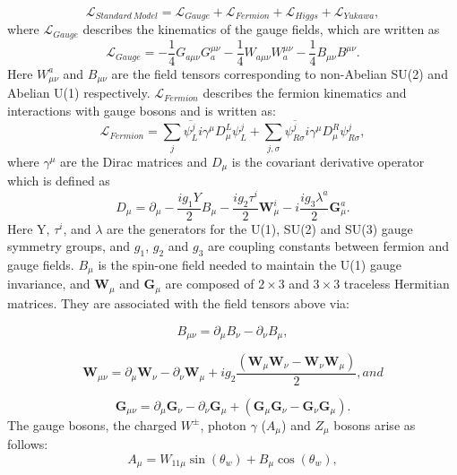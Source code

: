 \begin{equation}
    \mathcal{L}_{Standard\ Model}= \mathcal{L}_{Gauge}+ \mathcal{L}_{Fermion}+ \mathcal{L}_{Higgs}+ \mathcal{L}_{Yukawa},
  \label{eq:Standard Modelall}
\end{equation}
where $\mathcal{L}_{Gauge}$ describes the kinematics of the gauge fields, which are written as
\begin{equation}
    \mathcal{L}_{Gauge}= -\frac{1}{4}G_{a\mu\nu}G^{\mu\nu}_a - \frac{1}{4}W_{a\mu\nu}W^{\mu\nu}_a - \frac{1}{4}B_{\mu\nu}B^{\mu\nu}.
\end{equation}
Here $W_{\mu\nu}^a$ and $B_{\mu\nu}$ are the field tensors corresponding to non-Abelian SU(2) and Abelian U(1) respectively.
$\mathcal{L}_{Fermion}$ describes the fermion kinematics and interactions with gauge bosons and is written as:
\begin{equation}
    \mathcal{L}_{Fermion}=\sum_j \overline{\psi^j_L}i\gamma^\mu D^L_\mu \psi^j_L + \sum_{j, \sigma} \overline{\psi^j_{R\sigma}}i\gamma^{\mu}D^R_{\mu}\psi^j_{R\sigma},
    \label{eq:smf}
\end{equation}
where $\gamma^{\mu}$ are the Dirac matrices and $D_{\mu}$ is the covariant derivative operator which is defined as 
\begin{equation}
    D_\mu=\partial_\mu-\frac{ig_1Y}{2}B_\mu-\frac{ig_2\tau^i}{2}\mathbf{W}^i_\mu-i\frac{ig_3\lambda^a}{2}\mathbf{G}^a_\mu.
    \label{eq:dirac}
\end{equation}
Here Y, $\tau^i$, and $\lambda$ are the generators for the U(1), SU(2) and SU(3) gauge symmetry groups, and $g_1$, $g_2$ and $g_3$ 
are coupling constants between fermion and gauge fields. 
$B_\mu$ is the spin-one field needed to maintain the U(1) gauge invariance,
and $\mathbf{W}_\mu$ and $\mathbf{G}_\mu$ are composed of $2\times3$ and $3\times3$ traceless Hermitian matrices.
They are associated with the field tensors above via:

\begin{equation*}
  B_{\mu\nu}=\partial_\mu B_\nu-\partial_\nu B_\mu,
\end{equation*}

\begin{equation*}
  \mathbf{W}_{\mu\nu}=\partial_\mu\mathbf{W}_\nu-\partial_\nu\mathbf{W}_\mu+ig_2\frac{\left(\mathbf{W}_\mu\mathbf{W}_\nu-\mathbf{W}_\nu\mathbf{W}_\mu\right)}{2}, and 
\end{equation*}

\begin{equation*}
  \mathbf{G}_{\mu\nu}=\partial_\mu\mathbf{G}_\nu-\partial_\nu\mathbf{G}_\mu+\left(\mathbf{G}_\mu\mathbf{G}_\nu-\mathbf{G}_\nu\mathbf{G}_\mu\right).
\end{equation*}
The gauge bosons, the charged $W^{\pm}$, photon $\gamma$ ($A_\mu$) and $Z_\mu$ bosons arise as follows:
\begin{equation*}
  A_\mu=W_{11\mu}\sin\left(\theta_w\right)+B_\mu\cos\left(\theta_w\right),
\end{equation*}

